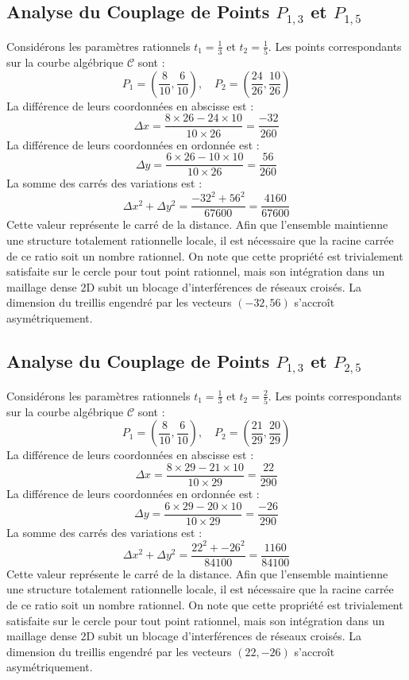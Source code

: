 \documentclass[12pt, a4paper]{article}
\begin{document}
\subsection{Analyse du Couplage de Points $P_{1,3}$ et $P_{1,5}$}
Considérons les paramètres rationnels $t_1 = \frac{1}{3}$ et $t_2 = \frac{1}{5}$.
Les points correspondants sur la courbe algébrique $\mathcal{C}$ sont :
$$ P_1 = \left( \frac{8}{10}, \frac{6}{10} \right), \quad P_2 = \left( \frac{24}{26}, \frac{10}{26} \right) $$
La différence de leurs coordonnées en abscisse est :
$$ \Delta x = \frac{8 \times 26 - 24 \times 10}{10 \times 26} = \frac{-32}{260} $$
La différence de leurs coordonnées en ordonnée est :
$$ \Delta y = \frac{6 \times 26 - 10 \times 10}{10 \times 26} = \frac{56}{260} $$
La somme des carrés des variations est :
$$ \Delta x^2 + \Delta y^2 = \frac{ -32^2 + 56^2 }{ 67600 } = \frac{ 4160 }{ 67600 } $$
Cette valeur représente le carré de la distance. Afin que l'ensemble maintienne une structure totalement rationnelle locale, il est nécessaire que la racine carrée de ce ratio soit un nombre rationnel. On note que cette propriété est trivialement satisfaite sur le cercle pour tout point rationnel, mais son intégration dans un maillage dense 2D subit un blocage d'interférences de réseaux croisés. La dimension du treillis engendré par les vecteurs $( -32, 56 )$ s'accroît asymétriquement.


\subsection{Analyse du Couplage de Points $P_{1,3}$ et $P_{2,5}$}
Considérons les paramètres rationnels $t_1 = \frac{1}{3}$ et $t_2 = \frac{2}{5}$.
Les points correspondants sur la courbe algébrique $\mathcal{C}$ sont :
$$ P_1 = \left( \frac{8}{10}, \frac{6}{10} \right), \quad P_2 = \left( \frac{21}{29}, \frac{20}{29} \right) $$
La différence de leurs coordonnées en abscisse est :
$$ \Delta x = \frac{8 \times 29 - 21 \times 10}{10 \times 29} = \frac{22}{290} $$
La différence de leurs coordonnées en ordonnée est :
$$ \Delta y = \frac{6 \times 29 - 20 \times 10}{10 \times 29} = \frac{-26}{290} $$
La somme des carrés des variations est :
$$ \Delta x^2 + \Delta y^2 = \frac{ 22^2 + -26^2 }{ 84100 } = \frac{ 1160 }{ 84100 } $$
Cette valeur représente le carré de la distance. Afin que l'ensemble maintienne une structure totalement rationnelle locale, il est nécessaire que la racine carrée de ce ratio soit un nombre rationnel. On note que cette propriété est trivialement satisfaite sur le cercle pour tout point rationnel, mais son intégration dans un maillage dense 2D subit un blocage d'interférences de réseaux croisés. La dimension du treillis engendré par les vecteurs $( 22, -26 )$ s'accroît asymétriquement.
\end{document}
